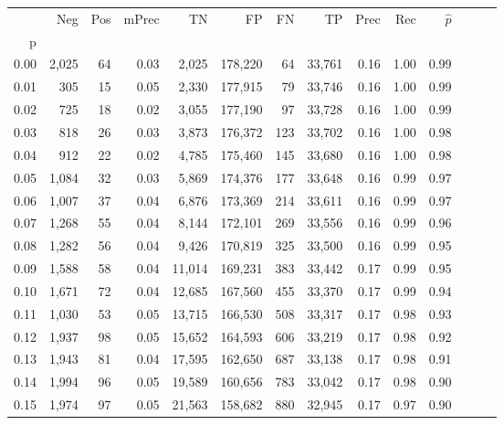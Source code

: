 \begin{tabular}{rrrrrrrrrrrrrr}
\toprule
{} &    Neg &  Pos & mPrec &       TN &       FP &      FN &      TP &  Prec &   Rec & $\hat{p}$ \\
p    &        &      &       &          &          &         &         &       &       &           \\
\midrule
0.00 &  2,025 &   64 &  0.03 &    2,025 &  178,220 &      64 &  33,761 &  0.16 &  1.00 &      0.99 \\
0.01 &    305 &   15 &  0.05 &    2,330 &  177,915 &      79 &  33,746 &  0.16 &  1.00 &      0.99 \\
0.02 &    725 &   18 &  0.02 &    3,055 &  177,190 &      97 &  33,728 &  0.16 &  1.00 &      0.99 \\
0.03 &    818 &   26 &  0.03 &    3,873 &  176,372 &     123 &  33,702 &  0.16 &  1.00 &      0.98 \\
0.04 &    912 &   22 &  0.02 &    4,785 &  175,460 &     145 &  33,680 &  0.16 &  1.00 &      0.98 \\
0.05 &  1,084 &   32 &  0.03 &    5,869 &  174,376 &     177 &  33,648 &  0.16 &  0.99 &      0.97 \\
0.06 &  1,007 &   37 &  0.04 &    6,876 &  173,369 &     214 &  33,611 &  0.16 &  0.99 &      0.97 \\
0.07 &  1,268 &   55 &  0.04 &    8,144 &  172,101 &     269 &  33,556 &  0.16 &  0.99 &      0.96 \\
0.08 &  1,282 &   56 &  0.04 &    9,426 &  170,819 &     325 &  33,500 &  0.16 &  0.99 &      0.95 \\
0.09 &  1,588 &   58 &  0.04 &   11,014 &  169,231 &     383 &  33,442 &  0.17 &  0.99 &      0.95 \\
0.10 &  1,671 &   72 &  0.04 &   12,685 &  167,560 &     455 &  33,370 &  0.17 &  0.99 &      0.94 \\
0.11 &  1,030 &   53 &  0.05 &   13,715 &  166,530 &     508 &  33,317 &  0.17 &  0.98 &      0.93 \\
0.12 &  1,937 &   98 &  0.05 &   15,652 &  164,593 &     606 &  33,219 &  0.17 &  0.98 &      0.92 \\
0.13 &  1,943 &   81 &  0.04 &   17,595 &  162,650 &     687 &  33,138 &  0.17 &  0.98 &      0.91 \\
0.14 &  1,994 &   96 &  0.05 &   19,589 &  160,656 &     783 &  33,042 &  0.17 &  0.98 &      0.90 \\
0.15 &  1,974 &   97 &  0.05 &   21,563 &  158,682 &     880 &  32,945 &  0.17 &  0.97 &      0.90 \\

\end{tabular}
